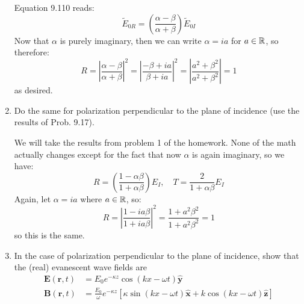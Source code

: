 \documentclass[10pt]{article}
\begin{document}
\begin{enumerate}[label=(\alph*)]
			\begin{solution}
				Equation 9.110 reads:
				\[
					\tilde E_{0R} = \left( \frac{\alpha - \beta}{\alpha + \beta} \right)\tilde E_{0I}
				\]
				Now that \( \alpha \) is purely imaginary, then we can write \( \alpha = ia \) for \( a \in
				\mathbb R \), so therefore:
				\[
					R = \left| \frac{\alpha - \beta}{\alpha + \beta} \right|^2 = \left| \frac{- \beta +
					ia}{\beta + ia} \right|^2 = \left| \frac{a^2 +
					\beta^2}{a^2 + \beta^2} \right| = 1
				\]
				as desired.   
			\end{solution}
		\item Do the same for polarization perpendicular to the plane of incidence (use the results of Prob.
			9.17). 

			\begin{solution}
				We will take the results from problem 1 of the homework. None of the math actually changes
				except for the fact that now \( \alpha \) is again imaginary, so we have:
				\[
					R = \left( \frac{1 - \alpha \beta}{1 + \alpha \beta} \right)E_I,  \quad T = \frac{2}{1 +
					\alpha \beta} E_I
				\]
				Again, let \( \alpha = ia \) where \( a \in \mathbb R \), so:
				\[
					R = \left| \frac{1 - ia \beta}{1 + ia \beta} \right|^2 = \frac{1 + a^2 \beta^2}{1
					+ a^2 \beta^2}  = 1	
				\]
				so this is the same. 
			\end{solution}
		\item In the case of polarization perpendicular to the plane of incidence, show that the (real)
			evanescent wave fields are
			\begin{align*}
				\mathbf{E}(\mathbf{r}, t) &= E_0e^{-\kappa z}\cos(kx - \omega t) \hat{\mathbf{y}}\\
				\mathbf{B}(\mathbf{r}, t) &=  \frac{E_0}{\omega}e^{-\kappa z}\left[ \kappa \sin (kx - \omega
				t) \mathbf{ \hat{x}} + k \cos(kx - \omega t) \hat{\mathbf{z}}\right] 
			\end{align*}


\end{enumerate}
\end{document}
